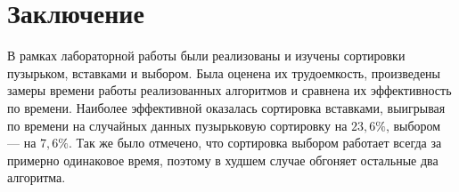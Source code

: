 \chapter*{Заключение}

В рамках лабораторной работы были реализованы и изучены сортировки пузырьком, вставками и выбором.
Была оценена их трудоемкость, произведены замеры времени работы реализованных алгоритмов и сравнена их эффективность по времени.
Наиболее эффективной оказалась сортировка вставками, выигрывая по времени на случайных данных пузырьковую сортировку на $23,6 \%$, выбором — на $7,6 \%$.
Так же было отмечено, что сортировка выбором работает всегда за примерно одинаковое время, поэтому в худшем случае обгоняет остальные два алгоритма.